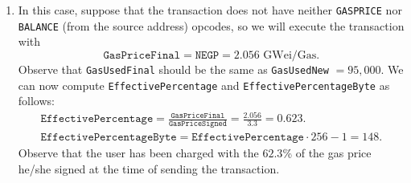 \begin{enumerate}
\item In this case, suppose that the transaction does not have neither \texttt{GASPRICE} nor \texttt{BALANCE} (from the source address) opcodes, so we will execute the transaction with
\[
\texttt{GasPriceFinal} = \texttt{NEGP} = 2.056 \text{ GWei/Gas}.
\]
Observe that \texttt{GasUsedFinal} should be the same as \texttt{GasUsedNew} $= 95,000$. We can now compute \texttt{EffectivePercentage} and \texttt{EffectivePercentageByte} as follows:
\begin{gather*}
\texttt{EffectivePercentage} = \frac{\texttt{GasPriceFinal}}{\texttt{GasPriceSigned}} = \frac{2.056}{3.3} = 0.623. \\
\texttt{EffectivePercentageByte} = \texttt{EffectivePercentage} \cdot 256  - 1 = 148.
\end{gather*}
Observe that the user has been charged with the $62.3$\% of the gas price he/she signed at the time of sending the transaction.

\end{enumerate}